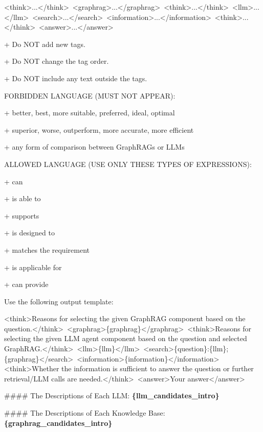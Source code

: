 \begin{tcolorbox}[
    mygreenbox,
    enhanced jigsaw,
    width=\textwidth,
    notitle,
    before upper={
        \setlength{\parindent}{0pt}
        \setlength{\parskip}{0pt}
    }
]


{\ttfamily\raggedright\noindent
<think>...\allowbreak</think>\,\allowbreak
<graphrag>...\allowbreak</graphrag>\,\allowbreak
<think>...\allowbreak</think>\,\allowbreak
<llm>...\allowbreak</llm>\,\allowbreak
<search>...\allowbreak</search>\,\allowbreak
<information>...\allowbreak</information>\,\allowbreak
<think>...\allowbreak</think>\,\allowbreak
<answer>...\allowbreak</answer>\par
}

+ Do NOT add new tags.\par
+ Do NOT change the tag order.\par
+ Do NOT include any text outside the tags.\par

\medskip
FORBIDDEN LANGUAGE (MUST NOT APPEAR): \par
+ better, best, more suitable, preferred, ideal, optimal \par
+ superior, worse, outperform, more accurate, more efficient \par
+ any form of comparison between GraphRAGs or LLMs \par

\medskip
ALLOWED LANGUAGE (USE ONLY THESE TYPES OF EXPRESSIONS): \par
+ can \par
+ is able to \par
+ supports \par
+ is designed to \par
+ matches the requirement \par
+ is applicable for \par
+ can provide \par

\medskip
Use the following output template:\par

{\ttfamily\raggedright\noindent
<think>Reasons for selecting the given GraphRAG component based on the question.</think>\,\allowbreak
<graphrag>\{graphrag\}</graphrag>\,\allowbreak
<think>Reasons for selecting the given LLM agent component based on the question and selected GraphRAG.</think>\,\allowbreak
<llm>\{llm\}</llm>\,\allowbreak
<search>\{question\}:\{llm\};\{graphrag\}</search>\,\allowbreak
<information>\{information\}</information>\,\allowbreak
<think>Whether the information is sufficient to answer the question or further retrieval/LLM calls are needed.</think>\,\allowbreak
<answer>Your answer</answer>\par
}

\medskip
\noindent \#\#\#\# The Descriptions of Each LLM: \textbf{\textcolor{myblue}{\{llm\_candidates\_intro\}}}\par\noindent

\medskip
\noindent \#\#\#\# The Descriptions of Each Knowledge Base: \textbf{\textcolor{myblue}{\{graphrag\_candidates\_intro\}}}\par\noindent


\end{tcolorbox}

